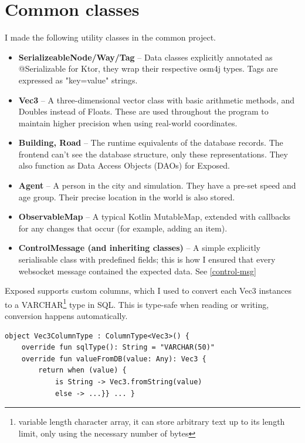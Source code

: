 \section{Common classes}

I made the following utility classes in the common project. \begin{itemize}
    \item \textbf{SerializeableNode/Way/Tag} -- Data classes explicitly annotated as @Serializable for Ktor, they wrap their respective osm4j types. Tags are expressed as "key=value" strings.
    \item \textbf{Vec3} -- A three-dimensional vector class with basic arithmetic methods, and Doubles instead of Floats. These are used throughout the program to maintain higher precision when using real-world coordinates.
    \item \textbf{Building, Road} -- The runtime equivalents of the database records. The frontend can't see the database structure, only these representations. They also function as Data Access Objects (DAOs) for Exposed.
    \item \textbf{Agent} -- A person in the city and simulation. They have a pre-set speed and age group. Their precise location in the world is also stored.
    \item \textbf{ObservableMap} -- A typical Kotlin MutableMap, extended with callbacks for any changes that occur (for example, adding an item).
    \item \textbf{ControlMessage (and inheriting classes)} -- A simple explicitly serialisable class with predefined fields; this is how I ensured that every websocket message contained the expected data. See \ref{control-msg}
\end{itemize}

\label{serialise}
Exposed supports custom columns, which I used to convert each Vec3 instances to a VARCHAR\footnote{variable length character array, it can store arbitrary text up to its length limit, only using the necessary number of bytes} type in SQL. This is type-safe when reading or writing, conversion happens automatically.
\begin{lstlisting}[caption=Custom column type in JetBrains Exposed]
    object Vec3ColumnType : ColumnType<Vec3>() {
    override fun sqlType(): String = "VARCHAR(50)"
    override fun valueFromDB(value: Any): Vec3 {
        return when (value) {
            is String -> Vec3.fromString(value)
            else -> ...}} ... }
\end{lstlisting}


